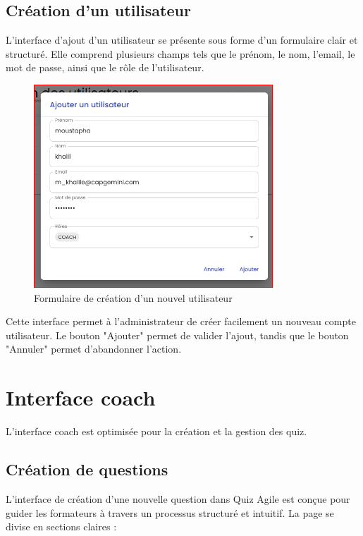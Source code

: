 \documentclass[12pt,a4paper]{report}
\begin{document}
\subsection{Création d'un utilisateur}

L'interface d'ajout d'un utilisateur se présente sous forme d'un formulaire clair et structuré. Elle comprend plusieurs champs tels que le prénom, le nom, l'email, le mot de passe, ainsi que le rôle de l'utilisateur.

\begin{figure}[H]
\centering
\includegraphics[width=0.8\textwidth]{latex_media/media/image54.png}
\caption{Formulaire de création d'un nouvel utilisateur}
\label{fig:creation-utilisateur}
\end{figure}

Cette interface permet à l'administrateur de créer facilement un nouveau compte utilisateur. Le bouton "Ajouter" permet de valider l'ajout, tandis que le bouton "Annuler" permet d'abandonner l'action.

\section{Interface coach}

L'interface coach est optimisée pour la création et la gestion des quiz.

\subsection{Création de questions}

L'interface de création d'une nouvelle question dans Quiz Agile est conçue pour guider les formateurs à travers un processus structuré et intuitif. La page se divise en sections claires :
\end{document}
